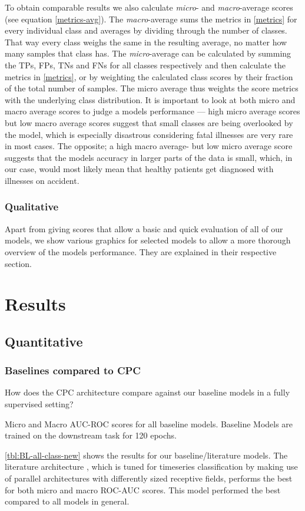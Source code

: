 To obtain comparable results we also calculate \emph{micro}- and \emph{macro}-average scores (see equation \ref{metrics-avg}). The \emph{macro}-average sums the metrics in \autoref{metrics} for every individual class and averages by dividing through the number of classes. That way every class weighs the same in the resulting average, no matter how many samples that class has. The \emph{micro}-average can be calculated by summing the TPs, FPs, TNs and FNs for all classes respectively and then calculate the metrics in \autoref{metrics}, or by weighting the calculated class scores by their fraction of the total number of samples. The micro average thus weights the score metrics with the underlying class distribution. It is important to look at both micro and macro average scores to judge a models performance --- high micro average scores but low macro average scores suggest that small classes are being overlooked by the model, which is especially disastrous considering fatal illnesses are very rare in most cases. The opposite; a high macro average- but low micro average score suggests that the models accuracy in larger parts of the data is small, which, in our case, would most likely mean that healthy patients get diagnosed with illnesses on accident.

\subsubsection{Qualitative}
Apart from giving scores that allow a basic and quick evaluation of all of our models, we show various graphics for selected models to allow a more thorough overview of the models performance. They are explained in their respective section.

\section{Results}\label{sec:results}
\subsection{Quantitative}
\subsubsection{Baselines compared to CPC}

How does the CPC architecture compare against our baseline models in a fully supervised setting?

\begin{table}\centering
	\resizebox{!}{0.2\textheight}{		
		
	}
	\label{tbl:BL-all-class-new}
	\caption*{\small Micro and Macro AUC-ROC scores for all baseline models. Baseline Models are trained on the downstream task for 120 epochs.}
\end{table}
\autoref{tbl:BL-all-class-new} shows the results for our baseline/literature models. 
The literature architecture , which is tuned for timeseries classification by making use of parallel architectures with differently sized receptive fields, performs the best for both micro and macro ROC-AUC scores. This model performed the best compared to all models in general.

